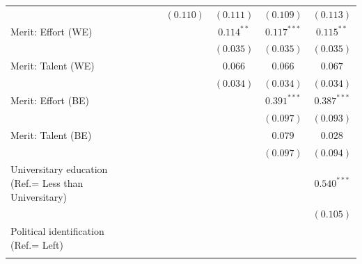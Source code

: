 \documentclass[
  12pt,
]{article}
\begin{document}
\begin{table}
\begin{center}
{\begin{tabular}{l c c c c c c c}
                                                      &                &                &                & $(0.110)$      & $(0.111)$      & $(0.109)$     & $(0.113)$      \\
Merit: Effort (WE)                                    &                &                &                &                & $0.114^{**}$   & $0.117^{***}$ & $0.115^{**}$   \\
                                                      &                &                &                &                & $(0.035)$      & $(0.035)$     & $(0.035)$      \\
Merit: Talent (WE)                                    &                &                &                &                & $0.066$        & $0.066$       & $0.067$        \\
                                                      &                &                &                &                & $(0.034)$      & $(0.034)$     & $(0.034)$      \\
Merit: Effort (BE)                                    &                &                &                &                &                & $0.391^{***}$ & $0.387^{***}$  \\
                                                      &                &                &                &                &                & $(0.097)$     & $(0.093)$      \\
Merit: Talent (BE)                                    &                &                &                &                &                & $0.079$       & $0.028$        \\
                                                      &                &                &                &                &                & $(0.097)$     & $(0.094)$      \\
Universitary education (Ref.= Less than Universitary) &                &                &                &                &                &               & $0.540^{***}$  \\
                                                      &                &                &                &                &                &               & $(0.105)$      \\
Political identification (Ref.= Left)                 &                &                &                &                &                &               &                \\
                                                      &                &                &                &                &                &               &                \\

\end{tabular}}
\end{center}
\end{table}
\end{document}
